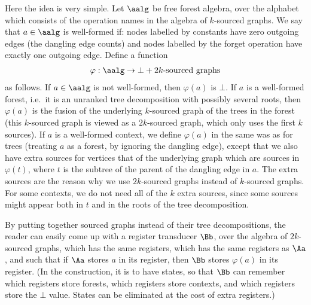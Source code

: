 Here the idea is very simple. Let $\aalg$ be free forest algebra, over the alphabet which consists of the operation names in the algebra of $k$-sourced graphs. We say that $a \in \aalg$ is well-formed if: nodes labelled by constants have zero outgoing edges (the dangling edge counts) and nodes labelled by the forget operation have exactly one outgoing edge. Define a function
\begin{align*}
    \varphi : \aalg \to \bot + \text{$2k$-sourced graphs}
\end{align*}
as follows. If $a \in \aalg$ is not well-formed, then $\varphi(a)$ is $\bot$. If $a$ is a well-formed forest, i.e.~it is an unranked tree decomposition with possibly several roots, then $\varphi(a)$ is the fusion of the  underlying $k$-sourced graph of the trees in the forest (this $k$-sourced graph is viewed as a $2k$-sourced graph, which only uses the first $k$ sources). If $a$ is a well-formed context, we define $\varphi(a)$ in the same was as for trees (treating $a$ as a forest, by ignoring the dangling edge), except that we also have  extra sources for vertices that of the underlying graph which are sources in $\varphi(t)$, where $t$ is the subtree of the parent of the dangling edge in $a$. The extra sources are the reason why we use $2k$-sourced graphs instead of $k$-sourced graphs. For some contexts, we do not need all of the $k$ extra sources, since some sources might appear both in $t$ and in the roots of the tree decomposition.

By putting together sourced graphs instead of their tree decompositions, the reader can easily come up with a register transducer $\Bb$, over the algebra of $2k$-sourced graphs, which has the same registers, which has the same registers as $\Aa$, and such that if $\Aa$ stores $a$ in its register, then $\Bb$ stores $\varphi(a)$ in its register. (In the construction, it is to have states, so that $\Bb$ can remember which registers store forests, which registers store contexts, and which registers store the $\bot$ value. States can be eliminated at the cost of extra registers.)

